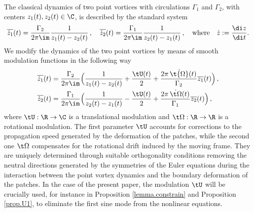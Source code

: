 \documentclass[a4paper,reqno,10pt]{article}
\begin{document}
The classical dynamics of two point vortices with circulations $\Gamma_1$ and $\Gamma_2$, with centers $z_1(t), z_2(t)\in\C$, is described by the standard system
 \begin{equation}\label{hiroshi1}
 	 \overline{\dot{z}_1}(t) = \frac{\Gamma_{2}}{2\pi \im} \frac{1}{z_1(t)-z_2(t)} \,, \quad \overline{\dot{z}_2}(t) = \frac{\Gamma_{1}}{2\pi \im} \frac{1}{z_2(t)-z_1(t)} \,,\quad\hbox{where}\quad \dot{z}:=\frac{\di z}{\di t}.
 \end{equation}
We modify the dynamics of the two point vortices by means of smooth modulation functions in the following way
 \begin{equation}\label{hiroshi1.mod}
 \begin{aligned}
 		 \overline{\dot{z}_1}(t) & = \frac{\Gamma_{2}}{2\pi \im}\Big( \frac{1}{z_1(t)-z_2(t)}  +\frac{\tU(t)}{2}  + \frac{2\pi\,\dot{\t{\Omega}}(t)}{\Gamma_{2}}  \overline{z_1}(t) \Big)   \,, \\
 		 \overline{\dot{z}_2}(t) & = \frac{\Gamma_{1}}{2\pi \im} \Big(  \frac{1}{z_2(t)-z_1(t)} -\frac{\tU(t)}{2} + \frac{2\pi\,\dot{\t\Omega}(t)}{\Gamma_{1}}  \overline{z_2}(t)\Big)\,,
 \end{aligned}
 \end{equation}
 where $\tU:\R\to\C$ is a translational modulation and   $\t\Omega:\R\to\R$ is a rotational modulation.
 The  first parameter $\tU$ accounts for corrections to the propagation speed generated by the deformation of the patches, while the second one $\t\Omega$ compensates for the rotational drift induced by the moving frame. They are uniquely determined through suitable orthogonality conditions removing the neutral directions generated by the symmetries of the Euler equations during the interaction between the point vortex dynamics and the boundary deformation of the patches.
 In the case of the present paper, the modulation $\tU$ will be crucially used, for instance in Proposition \ref{lemma.constrain} and Proposition \ref{prop.U1}, to eliminate the first sine mode from the nonlinear equations.
 
\end{document}
